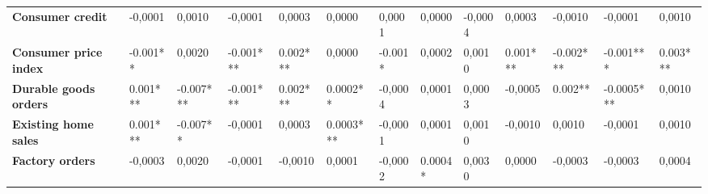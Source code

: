 \begin{landscape}
\begin{table}[]
{\begin{tabular}{@{}lllllllllllll@{}}
\textbf{Consumer credit}          & -0,0001                                 & 0,0010                                  & -0,0001                                 & 0,0003                                  & 0,0000                                  & 0,0001                                  & 0,0000                                  & -0,0004                                 & 0,0003                                  & -0,0010                                 & -0,0001                                 & 0,0010                                  \\
\textbf{Consumer price index}     & -0.001**                                & 0,0020                                  & -0.001***                               & 0.002***                                & 0,0000                                  & -0.001*                                 & 0,0002                                  & 0,0010                                  & 0.001***                                & -0.002***                               & -0.001***                               & 0.003***                                \\
\textbf{Durable goods orders}     & 0.001***                                & -0.007***                               & -0.001***                               & 0.002***                                & 0.0002**                                & -0,0004                                 & 0,0001                                  & 0,0003                                  & -0,0005                                 & 0.002**                                 & -0.0005***                              & 0,0010                                  \\
\textbf{Existing home sales}      & 0.001***                                & -0.007**                                & -0,0001                                 & 0,0003                                  & 0.0003***                               & -0,0001                                 & 0,0001                                  & 0,0010                                  & -0,0010                                 & 0,0010                                  & -0,0001                                 & 0,0010                                  \\
\textbf{Factory orders}           & -0,0003                                 & 0,0020                                  & -0,0001                                 & -0,0010                                 & 0,0001                                  & -0,0002                                 & 0.0004*                                 & 0,0030                                  & 0,0000                                  & -0,0003                                 & -0,0003                                 & 0,0004                                  \\

\end{tabular}}
\end{table}
\end{landscape}
